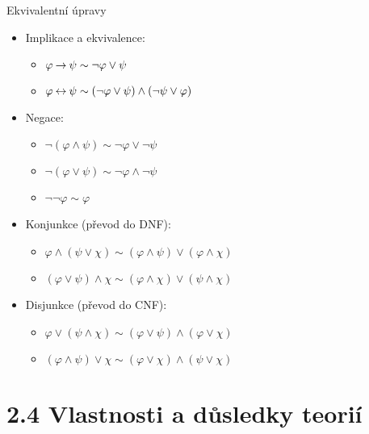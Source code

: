 \documentclass{beamer}
\begin{document}
\begin{frame}{Ekvivalentní úpravy}

\begin{itemize}
    \item Implikace a ekvivalence:
    \begin{itemize}
        \item[] $\varphi\mathbin{\rightarrow}\psi\sim\neg\varphi\lor\psi$
        \item[] $\varphi\mathbin{\leftrightarrow}\psi\sim(\neg\varphi\lor\psi)\land(\neg\psi\lor\varphi)$
    \end{itemize}
    \item Negace:
    \begin{itemize}
        \item[] $\neg(\varphi\land\psi)\sim\neg\varphi\lor\neg\psi$
        \item[] $\neg(\varphi\lor\psi)\sim\neg\varphi\land\neg\psi$
        \item[] $\neg\neg\varphi\sim\varphi$
    \end{itemize}
    \item Konjunkce (převod do DNF):
    \begin{itemize}
        \item[] $\varphi \land (\psi\lor\chi) \sim (\varphi\land\psi)\lor (\varphi\land\chi)$
        \item[] $(\varphi \lor \psi)\land\chi \sim (\varphi\land\chi)\lor (\psi\land\chi)$
    \end{itemize}
    \item Disjunkce (převod do CNF):
    \begin{itemize}
        \item[] $\varphi \lor (\psi\land\chi) \sim (\varphi\lor\psi)\land (\varphi\lor\chi)$
        \item[] $(\varphi \land \psi)\lor\chi \sim (\varphi\lor\chi)\land (\psi\lor\chi)$
    \end{itemize}
\end{itemize}

\end{frame}


\section{2.4 Vlastnosti a důsledky teorií}
\end{document}

